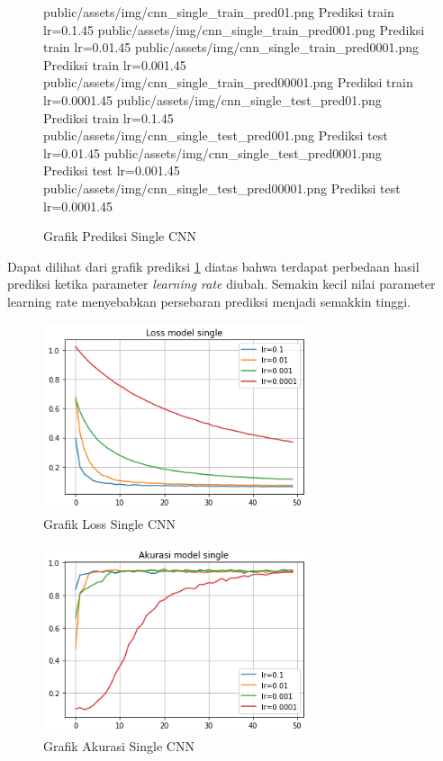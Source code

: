 \documentclass[./skripsi.tex]{subfiles}
\begin{document}
\begin{figure}%
\centering
\buatsubgrafik 
{public/assets/img/cnn_single_train_pred01.png}
{Prediksi train lr=0.1}{.45}{}
\buatsubgrafik 
{public/assets/img/cnn_single_train_pred001.png}
{Prediksi train lr=0.01}{.45}{}
\buatsubgrafik 
{public/assets/img/cnn_single_train_pred0001.png}
{Prediksi train lr=0.001}{.45}{}
\buatsubgrafik 
{public/assets/img/cnn_single_train_pred00001.png}
{Prediksi train lr=0.0001}{.45}{}
\buatsubgrafik 
{public/assets/img/cnn_single_test_pred01.png}
{Prediksi train lr=0.1}{.45}{}
\buatsubgrafik 
{public/assets/img/cnn_single_test_pred001.png}
{Prediksi test lr=0.01}{.45}{}
\buatsubgrafik 
{public/assets/img/cnn_single_test_pred0001.png}
{Prediksi test lr=0.001}{.45}{}
\buatsubgrafik 
{public/assets/img/cnn_single_test_pred00001.png}
{Prediksi test lr=0.0001}{.45}{}
\caption{Grafik Prediksi Single CNN}
\label{fig:cnn_single_pred}
\end{figure}
\par Dapat dilihat dari grafik prediksi \ref{fig:cnn_single_pred} diatas bahwa terdapat perbedaan hasil prediksi ketika parameter \textit{learning rate} diubah. Semakin kecil nilai parameter learning rate menyebabkan persebaran prediksi menjadi semakkin tinggi.
\begin{figure}%
	\centering
	\includegraphics[width=0.7\textwidth]{public/assets/img/cnn_single_loss.png}
	\caption{Grafik Loss Single CNN}
	\label{fig:cnn_single_loss}
\end{figure}
\begin{figure}%
	\centering
	\includegraphics[width=0.7\textwidth]{public/assets/img/cnn_single_acc.png}
	\caption{Grafik Akurasi Single CNN}
	\label{fig:cnn_single_acc}
\end{figure}
\end{document}
